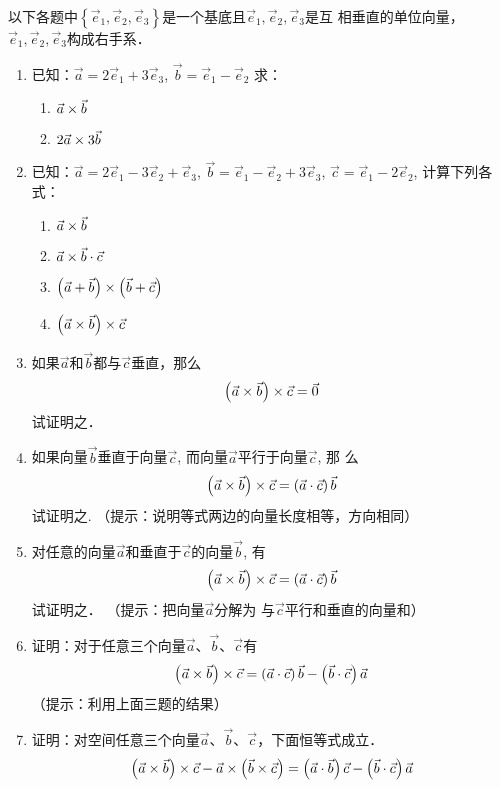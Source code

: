 \begin{ex}
以下各题中$\left\{\vec{e}_1,\vec{e}_2,\vec{e}_3\right\}$是一个基底且$\vec{e}_1,\vec{e}_2,\vec{e}_3$是互
相垂直的单位向量，$\vec{e}_1,\vec{e}_2,\vec{e}_3$构成右手系．
\begin{enumerate}
    \item 已知：$\vec{a}=2\vec{e}_1+3\vec{e}_3$, $\vec{b}=\vec{e}_1-\vec{e}_2$
    求：
\begin{multicols}{2}
\begin{enumerate}
    \item $\vec{a}\times \vec{b}$
    \item $2\vec{a}\times 3\vec{b}$
\end{enumerate}
\end{multicols}
    
\item 已知：$\vec{a}=2\vec{e}_1-3\vec{e}_2+\vec{e}_3$, $\vec{b}=\vec{e}_1-\vec{e}_2+3\vec{e}_3$, 
    $\vec{c}=\vec{e}_1-2\vec{e}_2$, 计算下列各式：
\begin{multicols}{2}
\begin{enumerate}
    \item $\vec{a}\times \vec{b}$
    \item $\vec{a}\times \vec{b}\cdot \vec{c}$
    \item $\left(\vec{a}+\vec{b}\right)\times \left(\vec{b}+\vec{c}\right)$
    \item $\left(\vec{a}\times \vec{b}\right)\times \vec{c}$
\end{enumerate}
\end{multicols}
\item 如果$\vec{a}$和$\vec{b}$都与$\vec{c}$垂直，那么
\[\left(\vec{a}\times \vec{b}\right)\times\vec{c}=\vec{0}\]
    试证明之．
    \item 如果向量$\vec{b}$垂直于向量$\vec{c}$, 而向量$\vec{a}$平行于向量$\vec{c}$, 那
    么
\[\left(\vec{a}\times \vec{b}\right)\times\vec{c}=\left(\vec{a}\cdot\vec{c}\right)\vec{b}\]
    试证明之. 
    （提示：说明等式两边的向量长度相等，方向相同）
    \item 对任意的向量$\vec{a}$和垂直于$\vec{c}$的向量$\vec{b}$, 有
    \[\left(\vec{a}\times \vec{b}\right)\times\vec{c}=\left(\vec{a}\cdot\vec{c}\right)\vec{b}\]
    试证明之．
    （提示：把向量$\vec{a}$分解为   
    与$\vec{c}$平行和垂直的向量和）
    
    \item 证明：对于任意三个向量$\vec{a}$、$\vec{b}$、$\vec{c}$有
    \[\left(\vec{a}\times \vec{b}\right)\times\vec{c}=\left(\vec{a}\cdot\vec{c}\right)\vec{b}-\left(\vec{b}\cdot\vec{c}\right)\vec{a}\]
    （提示：利用上面三题的结果）
    
    \item 证明：对空间任意三个向量$\vec{a}$、$\vec{b}$、$\vec{c}$，下面恒等式成立．
    \[\left(\vec{a}\times \vec{b}\right)\times\vec{c}-\vec{a}\times\left(\vec{b}\times \vec{c}\right)=\left(\vec{a}\cdot\vec{b}\right)\vec{c}-\left(\vec{b}\cdot\vec{c}\right)\vec{a}\]
\end{enumerate}
\end{ex}

